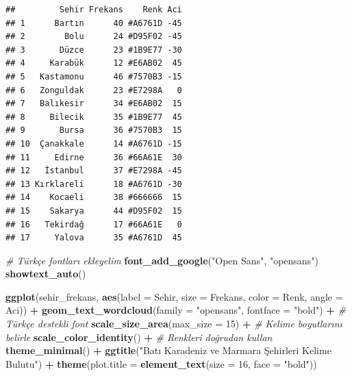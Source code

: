 \documentclass[
]{article}
\newenvironment{Shaded}{\begin{snugshade}}{\end{snugshade}}
\newcommand{\AttributeTok}[1]{\textcolor[rgb]{0.13,0.29,0.53}{#1}}
\newcommand{\CommentTok}[1]{\textcolor[rgb]{0.56,0.35,0.01}{\textit{#1}}}
\newcommand{\DecValTok}[1]{\textcolor[rgb]{0.00,0.00,0.81}{#1}}
\newcommand{\FunctionTok}[1]{\textcolor[rgb]{0.13,0.29,0.53}{\textbf{#1}}}
\newcommand{\NormalTok}[1]{#1}
\newcommand{\SpecialCharTok}[1]{\textcolor[rgb]{0.81,0.36,0.00}{\textbf{#1}}}
\newcommand{\StringTok}[1]{\textcolor[rgb]{0.31,0.60,0.02}{#1}}
\begin{document}
\begin{verbatim}
##         Sehir Frekans    Renk Aci
## 1      Bartın      40 #A6761D -45
## 2        Bolu      24 #D95F02 -45
## 3       Düzce      23 #1B9E77 -30
## 4     Karabük      12 #E6AB02  45
## 5   Kastamonu      46 #7570B3 -15
## 6   Zonguldak      23 #E7298A   0
## 7   Balıkesir      34 #E6AB02  15
## 8     Bilecik      35 #1B9E77  45
## 9       Bursa      36 #7570B3  15
## 10  Çanakkale      14 #A6761D -15
## 11     Edirne      36 #66A61E  30
## 12   İstanbul      37 #E7298A -45
## 13 Kırklareli      18 #A6761D -30
## 14    Kocaeli      38 #666666  15
## 15    Sakarya      44 #D95F02  15
## 16   Tekirdağ      17 #66A61E   0
## 17     Yalova      35 #A6761D  45
\end{verbatim}

\begin{Shaded}
\begin{Highlighting}[]
\CommentTok{\# Türkçe fontları ekleyelim}
\FunctionTok{font\_add\_google}\NormalTok{(}\StringTok{"Open Sans"}\NormalTok{, }\StringTok{"opensans"}\NormalTok{)}
\FunctionTok{showtext\_auto}\NormalTok{()}
\end{Highlighting}
\end{Shaded}

\begin{Shaded}
\begin{Highlighting}[]
\FunctionTok{ggplot}\NormalTok{(sehir\_frekans, }\FunctionTok{aes}\NormalTok{(}\AttributeTok{label =}\NormalTok{ Sehir, }\AttributeTok{size =}\NormalTok{ Frekans, }\AttributeTok{color =}\NormalTok{ Renk, }\AttributeTok{angle =}\NormalTok{ Aci)) }\SpecialCharTok{+}
  \FunctionTok{geom\_text\_wordcloud}\NormalTok{(}\AttributeTok{family =} \StringTok{"opensans"}\NormalTok{, }\AttributeTok{fontface =} \StringTok{"bold"}\NormalTok{) }\SpecialCharTok{+}  \CommentTok{\# Türkçe destekli font}
  \FunctionTok{scale\_size\_area}\NormalTok{(}\AttributeTok{max\_size =} \DecValTok{15}\NormalTok{) }\SpecialCharTok{+}  \CommentTok{\# Kelime boyutlarını belirle}
  \FunctionTok{scale\_color\_identity}\NormalTok{() }\SpecialCharTok{+}  \CommentTok{\# Renkleri doğrudan kullan}
  \FunctionTok{theme\_minimal}\NormalTok{() }\SpecialCharTok{+}
  \FunctionTok{ggtitle}\NormalTok{(}\StringTok{"Batı Karadeniz ve Marmara Şehirleri Kelime Bulutu"}\NormalTok{) }\SpecialCharTok{+}
  \FunctionTok{theme}\NormalTok{(}\AttributeTok{plot.title =} \FunctionTok{element\_text}\NormalTok{(}\AttributeTok{size =} \DecValTok{16}\NormalTok{, }\AttributeTok{face =} \StringTok{"bold"}\NormalTok{))}
\end{Highlighting}
\end{Shaded}
\end{document}
